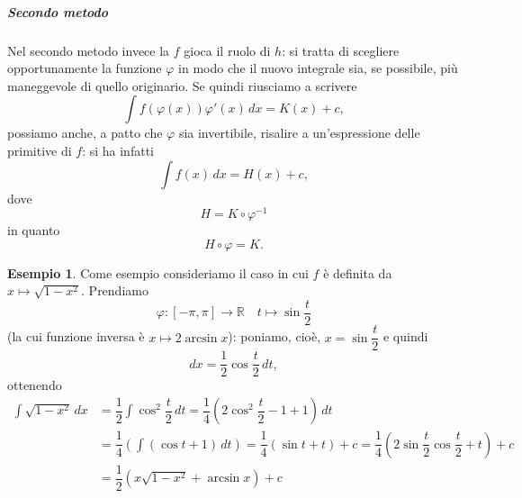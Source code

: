 \documentclass{article}
\theoremstyle{plain}
\theoremstyle{definition}
\newtheorem{exmp}{Esempio}[section]
\theoremstyle{remark}
\begin{document}
\subparagraph{Secondo metodo}
Nel secondo metodo invece la $f$ gioca il ruolo di $h$: si tratta di scegliere opportunamente la funzione $\varphi$ in modo che il nuovo integrale sia, se possibile, più maneggevole  di quello originario. 
Se quindi riusciamo a scrivere \[\int f(\varphi(x))\varphi'(x)\,dx=K(x)+c,\] possiamo anche, a patto che $\varphi$ sia invertibile, risalire a un'espressione delle primitive di $f$: si ha infatti 
\[\int f(x)\,dx=H(x)+c,\]dove \[H=K\circ\varphi^{-1}\] in quanto \[H\circ \varphi=K.\]

\vspace{10pt}

\begin{exmp}
    Come esempio consideriamo il caso in cui $f$ è definita da $x\mapsto\sqrt{1-x^2}$. Prendiamo 
    \[ \varphi:[-\pi,\pi]\to\mathbb{R}\quad t\mapsto \sin\dfrac{t}{2} \]
    (la cui funzione inversa è $x\mapsto 2\arcsin x$): poniamo, cioè, $x=\sin\dfrac{t}{2}$ e quindi \[dx=\dfrac{1}{2}\cos\dfrac{t}{2}\,dt,\] ottenendo
    \begin{align*}
        \int\sqrt{1-x^2}\,dx&=\dfrac{1}{2}\int\cos^2\dfrac{t}{2}\,dt=\dfrac{1}{4}\left(2\cos^2\dfrac{t}{2}-1+1\right)\,dt\\
        &=\dfrac{1}{4}\left(\int(\cos t+1)\,dt\right)=\dfrac{1}{4}(\sin t+t)+c=\dfrac{1}{4}\left(2\sin\dfrac{t}{2}\cos\dfrac{t}{2}+t\right)+c\\
        &=\dfrac{1}{2}(x\sqrt{1-x^2}+\arcsin x)+c
    \end{align*}
\end{exmp}

\vspace{10pt}
\end{document}
